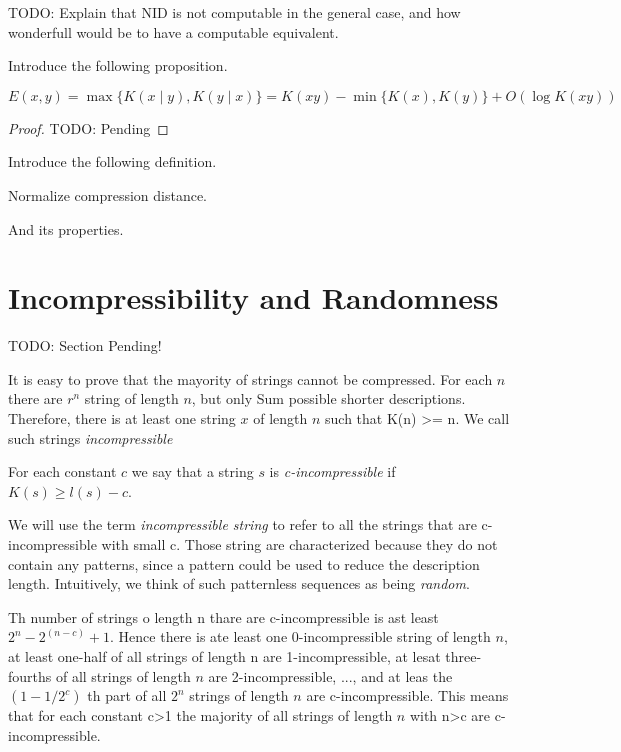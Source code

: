 {\color{red} TODO: Explain that NID is not computable in the general case, and how wonderfull would be to have a computable equivalent.}

{\color{red} Introduce the following proposition.}

\begin{proposition}
\[
E(x, y) = \max\{ K(x \mid y), K(y \mid x) \} = K(xy) - \min\{ K(x), K(y) \} + O(\log K(xy) )
\]
\end{proposition}
\begin{proof}
{\color{red} TODO: Pending}
\end{proof}

{\color{red} Introduce the following definition.}

\begin{definition}
Normalize compression distance.
\end{definition}

{\color{red} And its properties.}


%
%

\section{Incompressibility and Randomness}
\label{sec:incompressibility_randomness}

{\color{red} TODO: Section Pending!}

It is easy to prove that the mayority of strings cannot be compressed. For each $n$ there are $r^n$ string of length $n$, but only Sum possible shorter descriptions. Therefore, there is at least one string $x$ of length $n$ such that K(n) >= n. We call such strings \emph{incompressible}

\begin{definition}
For each constant $c$ we say that a string $s$ is \emph{c-incompressible} if $K(s)\geq l(s)-c$.
\end{definition}

We will use the term \emph{incompressible string} to refer to all the strings that are c-incompressible with small c. Those string are characterized because they do not contain any patterns, since a pattern could be used to reduce the description length. Intuitively, we think of such patternless sequences as being \emph{random}.

Th number of strings o length n thare are c-incompressible is ast least $2^n - 2^(n-c) + 1$. Hence there is ate least one 0-incompressible string of length $n$, at least one-half of all strings of length n are 1-incompressible, at lesat three-fourths of all strings of length $n$ are 2-incompressible, ..., and at leas the $(1-1/2^c)$ th part of all $2^n$ strings of length $n$ are c-incompressible. This means that for each constant c>1 the majority of all strings of length $n$ with n>c are c-incompressible.


